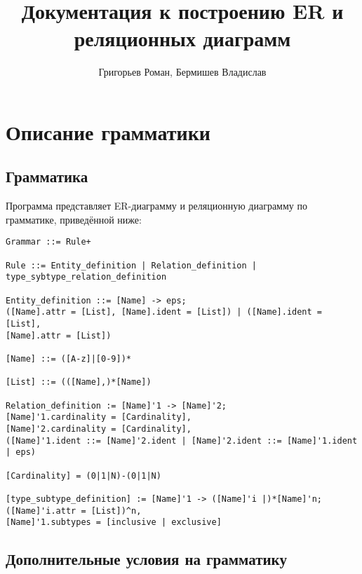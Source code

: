 \documentclass{article}
\title{Документация к построению ER и реляционных диаграмм}
\author{Григорьев Роман, Бермишев Владислав}
\begin{document}
\maketitle

\newpage
\tableofcontents

\newpage

\section{Описание грамматики}
\subsection{Грамматика}
\qquad Программа представляет ER-диаграмму и реляционную диаграмму по грамматике, приведённой ниже:
\begin{lstlisting}
Grammar ::= Rule+

Rule ::= Entity_definition | Relation_definition | type_sybtype_relation_definition

Entity_definition ::= [Name] -> eps; 
([Name].attr = [List], [Name].ident = [List]) | ([Name].ident = [List], 
[Name].attr = [List])

[Name] ::= ([A-z]|[0-9])*

[List] ::= (([Name],)*[Name])

Relation_definition := [Name]'1 -> [Name]'2; 
[Name]'1.cardinality = [Cardinality], 
[Name]'2.cardinality = [Cardinality], 
([Name]'1.ident ::= [Name]'2.ident | [Name]'2.ident ::= [Name]'1.ident | eps)

[Cardinality] = (0|1|N)-(0|1|N)

[type_subtype_definition] := [Name]'1 -> ([Name]'i |)*[Name]'n; 
([Name]'i.attr = [List])^n, 
[Name]'1.subtypes = [inclusive | exclusive]
\end{lstlisting}

\subsection{Дополнительные условия на грамматику}
\justifying

\flushleft
\end{document}
